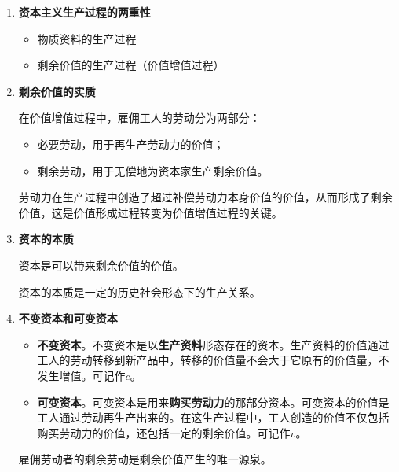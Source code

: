 \documentclass[12pt, a4paper, oneside]{ctexart}
\begin{document}
\begin{enumerate}
  \item {\bf 资本主义生产过程的两重性}
  
  \begin{itemize}
    \item 物质资料的生产过程
    \item 剩余价值的生产过程（价值增值过程）
  \end{itemize}

  \item {\bf 剩余价值的实质}
  
  在价值增值过程中，雇佣工人的劳动分为两部分：
  \begin{itemize}
    \item 必要劳动，用于再生产劳动力的价值；
    \item 剩余劳动，用于无偿地为资本家生产剩余价值。
  \end{itemize}

  劳动力在生产过程中创造了超过补偿劳动力本身价值的价值，从而形成了剩余价值，这是价值形成过程转变为价值增值过程的关键。

  \item {\bf 资本的本质}
  
  资本是可以带来剩余价值的价值。

  资本的本质是一定的历史社会形态下的生产关系。

  \item {\bf 不变资本和可变资本}
  
  \begin{itemize}
    \item {\bf 不变资本}。不变资本是以\textbf{生产资料}形态存在的资本。生产资料的价值通过工人的劳动转移到新产品中，转移的价值量不会大于它原有的价值量，不发生增值。可记作$c$。
    \item {\bf 可变资本}。可变资本是用来\textbf{购买劳动力}的那部分资本。可变资本的价值是工人通过劳动再生产出来的。在这生产过程中，工人创造的价值不仅包括购买劳动力的价值，还包括一定的剩余价值。可记作$v$。
  \end{itemize}

  雇佣劳动者的剩余劳动是剩余价值产生的唯一源泉。


\end{enumerate}
\end{document}
